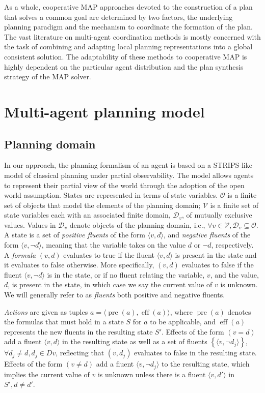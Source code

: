\documentclass[12pt]{article}
\DeclareMathOperator{\pre}{pre}
\DeclareMathOperator{\eff}{eff}
\begin{document}
As a whole, cooperative MAP approaches devoted to the construction of a plan that solves a common goal are determined by two factors, the underlying planning paradigm and the mechanism to coordinate the formation of the plan.
The vast literature on multi-agent coordination methods is mostly concerned with the task of combining and adapting local planning representations into a global consistent solution.
The adaptability of these methods to cooperative MAP is highly dependent on the particular agent distribution and the plan synthesis strategy of the MAP solver.

\section{Multi-agent planning model}

\subsection{Planning domain}

In our approach, the planning formalism of an agent is based on a STRIPS-like model of classical planning under partial observability.
The model allows agents to represent their partial view of the world through the adoption of the open world assumption.
States are represented in terms of state variables.
$\mathcal{O}$ is a finite set of objects that model the elements of the planning domain; $\mathcal{V}$ is a finite set of state variables each with an associated finite domain, $\mathcal{D}_v$, of mutually exclusive values.
Values in $\mathcal{D}_v$ denote objects of the planning domain, i.e., $\forall v \in \mathcal{V}, \mathcal{D}_v \subseteq \mathcal{O}$.
A state is a set of \textit{positive fluents} of the form $\langle v,d\rangle$, and \textit{negative fluents} of the form $\langle v,\neg d\rangle$, meaning that the variable takes on the value $d$ or $\neg d$, respectively.
A \textit{formula} $(v, d)$ evaluates to true if the fluent $\langle v,d\rangle$ is present in the state and it evaluates to false otherwise.
More specifically, $(v, d)$ evaluates to false if the fluent $\langle v,\neg d\rangle$ is in the state, or if no fluent relating the variable, $v$, and the value, $d$, is present in the state, in which case we say the current value of $v$ is unknown.
We will generally refer to as \textit{fluents} both positive and negative fluents.

\textit{Actions} are given as tuples $a = \langle \pre(a),\eff(a)\rangle$, where $\pre(a)$ denotes the formulas that must hold in a state $S$ for $a$ to be applicable, and $\eff(a)$ represents the new fluents in the resulting state $S'$.
Effects of the form $(v = d)$ add a fluent $\langle v,d\rangle$ in the resulting state as well as a set of fluents $\left\{ \langle v,\neg d_j\rangle \right\}$, $\forall d_j \neq d, d_j \in Dv$, reflecting that $(v, d_j)$ evaluates to false in the resulting state.
Effects of the form $(v \neq d)$ add a fluent $\langle v,\neg d_j\rangle$ to the resulting state, which implies the current value of $v$ is unknown unless there is a fluent $\langle v,d'\rangle$ in $S', d \neq d'$.
\end{document}
